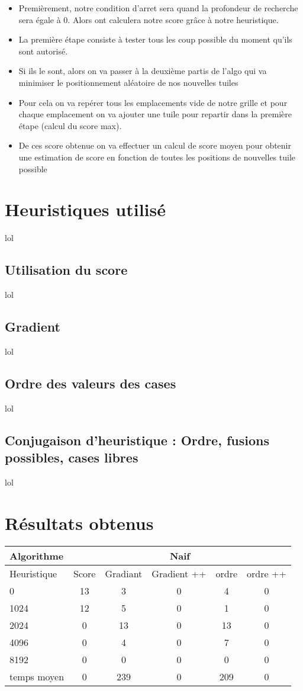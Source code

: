 \documentclass[11pt,a4paper]{article}
\begin{document}
\begin{itemize}
\item Premièrement, notre condition d'arret sera quand la profondeur de recherche sera égale à 0. Alors ont calculera notre score grâce à notre heuristique.
\item La première étape consiste à tester tous les coup possible du moment qu'ils sont autorisé.
\item Si ils le sont, alors on va passer à la deuxième partis de l'algo qui va minimiser le positionnement aléatoire de nos nouvelles tuiles
\item Pour cela on va repérer tous les emplacements vide de notre grille et pour chaque emplacement on va ajouter une tuile pour repartir dans la première étape (calcul du score max).
\item De ces score obtenue on va effectuer un calcul de score moyen pour obtenir une estimation de score en fonction de toutes les positions de nouvelles tuile possible

\end{itemize}


\section{Heuristiques utilisé}
lol
\subsection{Utilisation du score}
lol
\subsection{Gradient}
lol
\subsection{Ordre des valeurs des cases}
lol

\subsection{Conjugaison d'heuristique : Ordre, fusions possibles, cases libres}
lol
\newpage
\section{Résultats obtenus}


\begin{tabular}{|l|c|c|c|c|c|} 
   \hline
    Algorithme & \multicolumn{5}{c|}{ Naif } \\
    \hline
    Heuristique & Score & Gradiant & Gradient ++ & ordre & ordre ++ \\
    \hline
    0 & 13 & 3 & 0 & 4 & 0\\
    \hline
    1024 & 12 & 5 & 0 & 1 & 0\\
    \hline
    2024 & 0 & 13 & 0 & 13 & 0 \\
    \hline
    4096 & 0 & 4 & 0 & 7 & 0 \\
    \hline
    8192 & 0 & 0 & 0 & 0 & 0 \\
    \hline
    temps moyen & 0 & 239 & 0 & 209 & 0 \\
    \hline
\end{tabular}
\end{document}
